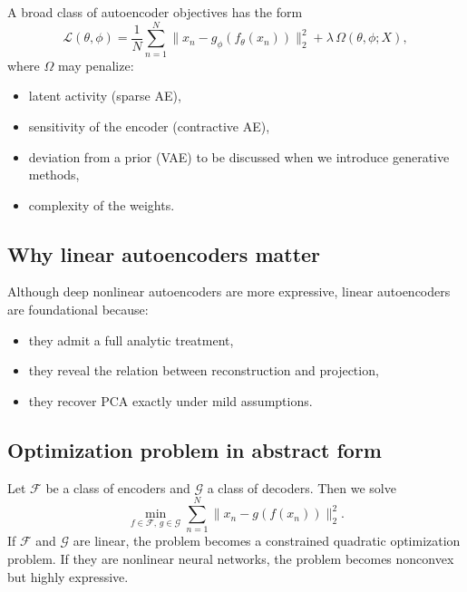 \documentclass[%
oneside,                 %
final,                   %
10pt]{article}
\begin{document}
A broad class of autoencoder objectives has the form
\[
\mathcal{L}(\theta,\phi)
=
\frac{1}{N}\sum_{n=1}^N \|x_n-g_\phi(f_\theta(x_n))\|_2^2
+
\lambda\,\Omega(\theta,\phi;X),
\]
where \(\Omega\) may penalize:
\begin{block}{}
\begin{itemize}
\item latent activity (sparse AE),

\item sensitivity of the encoder (contractive AE),

\item deviation from a prior (VAE) to be discussed when we introduce generative methods,

\item complexity of the weights.
\end{itemize}

\noindent
\end{block}

\subsection{Why linear autoencoders matter}

Although deep nonlinear autoencoders are more expressive, linear autoencoders are foundational because:
\begin{block}{}
\begin{itemize}
\item they admit a full analytic treatment,

\item they reveal the relation between reconstruction and projection,

\item they recover PCA exactly under mild assumptions.
\end{itemize}

\noindent
\end{block}

\subsection{Optimization problem in abstract form}

Let \(\mathcal{F}\) be a class of encoders and \(\mathcal{G}\) a class of decoders. Then we solve
\[
\min_{f\in\mathcal{F},\, g\in\mathcal{G}}
\sum_{n=1}^N \|x_n-g(f(x_n))\|_2^2.
\]
If \(\mathcal{F}\) and \(\mathcal{G}\) are linear, the problem becomes a constrained quadratic optimization problem.
If they are nonlinear neural networks, the problem becomes nonconvex but highly expressive.
\end{document}
